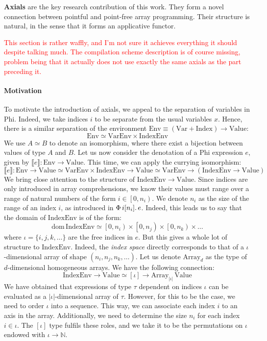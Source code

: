 \textbf{Axials} are the key research contribution of this work. They form a novel connection between pointful and point-free array programming. Their structure is natural, in the sense that it forms an applicative functor.

\begin{center}
    \textcolor{red}{This section is rather waffly, and I'm not sure it achieves everything it should despite talking much. The compilation scheme description is of course missing, problem being that it actually does not use exactly the same axials as the part preceding it.}
\end{center}


\paragraph{Motivation}

To motivate the introduction of axials, we appeal to the separation of variables in Phi. Indeed, we take indices $i$ to be separate from the usual variables $x$. Hence, there is a similar separation of the environment $\mathrm{Env} \equiv (\mathrm{Var} + \mathrm{Index}) \to \mathrm{Value}$:
$$ \mathrm{Env} \simeq \mathrm{VarEnv} \times \mathrm{IndexEnv} $$
We use $A \simeq B$ to denote an isomorphism, where there exist a bijection between values of type $A$ and $B$. Let us now consider the denotation of a Phi expression $e$, given by $\llbracket e \rrbracket : \mathrm{Env} \to \mathrm{Value}$. This time, we can apply the currying isomorphism:
$$\llbracket e \rrbracket : \mathrm{Env} \to \mathrm{Value} \simeq \mathrm{VarEnv} \times \mathrm{IndexEnv} \to \mathrm{Value} \simeq \mathrm{VarEnv} \to (\mathrm{IndexEnv} \to \mathrm{Value})$$
We bring close attention to the structure of $\mathrm{IndexEnv} \to \mathrm{Value}$. Since indices are only introduced in array comprehensions, we know their values must range over a range of natural numbers of the form $i \in \left[ 0, n_i \right)$. We denote $n_i$ as the size of the range of an index $i$, as introduced in $\Phi\, {i}[{n_i}] \ldotp {e}$. Indeed, this leads us to say that the domain of $\mathrm{IndexEnv}$ is of the form:
$$ \mathrm{dom}\,\mathrm{IndexEnv} \simeq \left[0, n_i \right) \times \left[0, n_j \right) \times \left[0, n_k \right) \times \dots $$ 
where $\iota = \{i, j, k, \dots \}$ are the free indices in $e$. But this gives a whole lot of structure to $\mathrm{IndexEnv}$. Indeed, the \textit{index space} directly corresponds to that of a $\iota$-dimensional array of shape $(n_i, n_j, n_k, \dots)$. Let us denote $\mathrm{Array}_d$ as the type of $d$-dimensional homogeneous arrays. We have the following connection:
$$ \mathrm{IndexEnv} \to \mathrm{Value} \simeq [\iota] \to \mathrm{Array}_{|\iota|}\, \mathrm{Value} $$
We have obtained that expressions of type $\tau$ dependent on indices $\iota$ can be evaluated as a $|\iota|$-dimensional array of $\tau$. However, for this to be the case, we need to order $\iota$ into a sequence. This way, we can associate each index $i$ to an axis in the array. Additionally, we need to determine the size $n_i$ for each index $i \in \iota$. The $[\iota]$ type fulfils these roles, and we take it to be the permutations on $\iota$ endowed with $\iota \to \mathbb N$.

